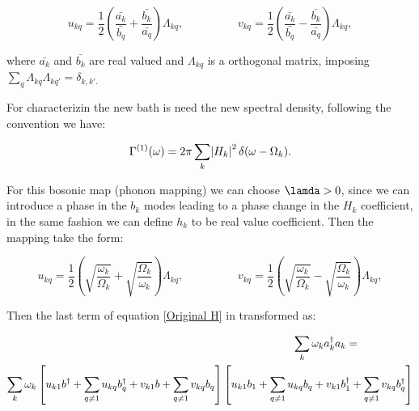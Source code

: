 \documentclass[12pt]{article}
\begin{document}
\begin{equation}
    u_{kq} = \frac{1}{2} \left( \frac{\bar{a_k}}{ \bar{b_q}} + \frac{\bar{b_k}}{ \bar{a_q}}  \right) \Lambda_{kq}, \hspace{2cm}  v_{kq} = \frac{1}{2} \left( \frac{\bar{a_k}}{ \bar{b_q}} - \frac{\bar{b_k}}{ \bar{a_q}}  \right) \Lambda_{kq},
\end{equation}

where  $\bar{a_k}$ and $\bar{b_k}$ are real valued and $\Lambda_{kq}$ is a orthogonal matrix, imposing $\sum_q \Lambda_{kq} \Lambda_{kq'} = \delta_{k,k'.}$


For characterizin the new bath is need the new spectral density, following the convention we have:

\begin{equation}
    \Gamma^{(1)} (\omega) = 2\pi \sum_k \abs{H_k}^2 \delta (\omega- \Omega_k).
\end{equation}


For this bosonic map (phonon mapping) we can choose $\lamda > 0 $, since we can introduce a phase in the $b_k$ modes leading to a phase change in the $H_k$ coefficient, in the same fashion we can define  $h_k$ to be real value coefficient. Then the mapping take the form:


\begin{equation}
    u_{kq} = \frac{1}{2} \left( \sqrt{ \frac{\omega_k}{\Omega_k}} + \sqrt{ \frac{\Omega_k}{\omega_k}}  \right) \Lambda_{kq}, \hspace{2cm}  v_{kq} = \frac{1}{2} \left( \sqrt{ \frac{\omega_k}{\Omega_k}} - \sqrt{ \frac{\Omega_k}{\omega_k}}  \right) \Lambda_{kq},
\end{equation}

Then the last term of equation \ref{Original H} in transformed as:

\begin{multline}
\hspace{7.5cm} \sum_k \omega_k a_k^{\dagger} a_k  =\\
\sum_k \omega_k  \left[ u_{k1} b^{\dagger} +\sum_{q\neq 1} u_{kq} b_q^{\dagger} + v_{k1} b+ \sum_{q\neq 1} v_{kq} b_q \right] \left[ u_{k1} b_1 +\sum_{q\neq 1} u_{kq} b_q + v_{k1} b_1^{\dagger}+ \sum_{q\neq 1} v_{kq} b_q^{\dagger} \right]
\label{third term}
\end{multline}
\end{document}
